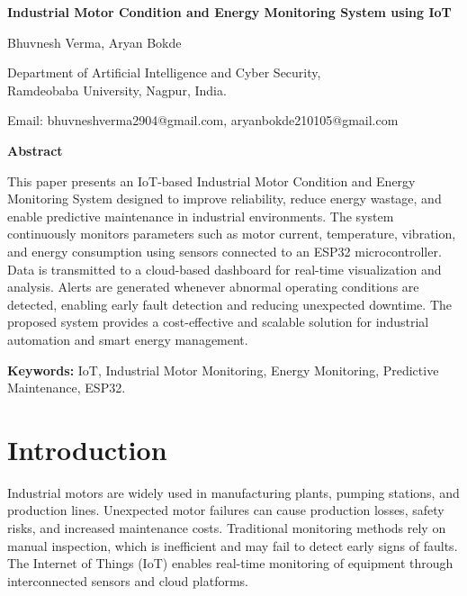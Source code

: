 \documentclass[12pt]{article}
\begin{document}
\begin{center}

{\Large \textbf{Industrial Motor Condition and Energy Monitoring System using IoT}}

\vspace{0.3cm}

Bhuvnesh Verma, Aryan Bokde

\vspace{0.2cm}

Department of Artificial Intelligence and Cyber Security,\\
Ramdeobaba University, Nagpur, India.

\vspace{0.2cm}

Email: bhuvneshverma2904@gmail.com, aryanbokde210105@gmail.com

\end{center}

\vspace{0.5cm}

\textbf{Abstract}

This paper presents an IoT-based Industrial Motor Condition and Energy Monitoring System designed to improve reliability, reduce energy wastage, and enable predictive maintenance in industrial environments. The system continuously monitors parameters such as motor current, temperature, vibration, and energy consumption using sensors connected to an ESP32 microcontroller. Data is transmitted to a cloud-based dashboard for real-time visualization and analysis. Alerts are generated whenever abnormal operating conditions are detected, enabling early fault detection and reducing unexpected downtime. The proposed system provides a cost-effective and scalable solution for industrial automation and smart energy management.

\vspace{0.3cm}

\textbf{Keywords:} IoT, Industrial Motor Monitoring, Energy Monitoring, Predictive Maintenance, ESP32.

\vspace{0.4cm}

\section{Introduction}

Industrial motors are widely used in manufacturing plants, pumping stations, and production lines. Unexpected motor failures can cause production losses, safety risks, and increased maintenance costs. Traditional monitoring methods rely on manual inspection, which is inefficient and may fail to detect early signs of faults. The Internet of Things (IoT) enables real-time monitoring of equipment through interconnected sensors and cloud platforms.
\end{document}

